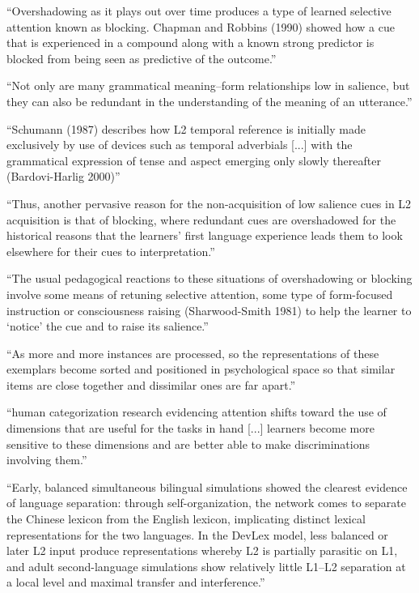 ``Overshadowing as it plays out over time produces a type of learned
selective attention known as blocking. Chapman and Robbins (1990) showed
how a cue that is experienced in a compound along with a known strong
predictor is blocked from being seen as predictive of the outcome.''

``Not only are many grammatical meaning–form relationships low in salience,
but they can also be redundant in the understanding of the meaning of
an utterance.''

``Schumann (1987) describes how L2 temporal reference is initially made exclusively
by use of devices such as temporal adverbials [...] with the grammatical expression of tense and aspect emerging only
slowly thereafter (Bardovi-Harlig 2000)''

``Thus, another pervasive reason for the non-acquisition of low salience cues
in L2 acquisition is that of blocking, where redundant cues are overshadowed
for the historical reasons that the learners’ first language experience leads
them to look elsewhere for their cues to interpretation.''

``The usual pedagogical reactions to these situations of overshadowing or
blocking involve some means of retuning selective attention, some type of
form-focused instruction or consciousness raising (Sharwood-Smith 1981) to
help the learner to ‘notice’ the cue and to raise its salience.''



``As more and more instances are processed,
so the representations of these exemplars become sorted and positioned in
psychological space so that similar items are close together and dissimilar
ones are far apart.''

``human categorization
research evidencing attention shifts toward the use of dimensions that are
useful for the tasks in hand [...] learners
become more sensitive to these dimensions and are better able to make
discriminations involving them.''

``Early, balanced simultaneous bilingual
simulations showed the clearest evidence of language separation: through
self-organization, the network comes to separate the Chinese lexicon from
the English lexicon, implicating distinct lexical representations for the
two languages. In the DevLex model, less balanced or later L2 input
produce representations whereby L2 is partially parasitic on L1, and adult
second-language simulations show relatively little L1–L2 separation at a local
level and maximal transfer and interference.''


